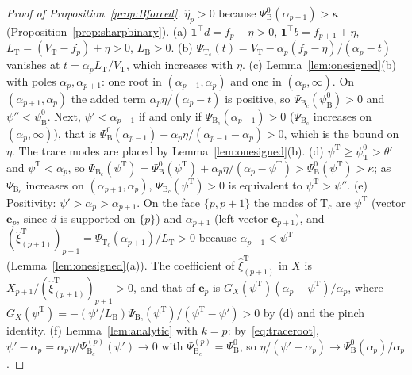 \documentclass[11pt,a4paper]{report}
\newcommand{\one}{\mathbf 1}
\newcommand{\bfe}{\mathbf e}
\newcommand{\Ts}{\mathrm T}
\newcommand{\Bs}{\mathrm B}
\begin{document}
\begin{proof}[Proof of Proposition~\ref{prop:Bforced}]
\(\hat\eta_p>0\) because \(\Psi^0_\Bs(\alpha_{p-1})>\kappa\) (Proposition~\ref{prop:sharpbinary}). (a) \(\one^\top d=f_p-\eta>0\), \(\one^\top b=f_{p+1}+\eta\),
\(L_\Ts=(V_\Ts-f_p)+\eta>0\), \(L_\Bs>0\). (b) \(\Psi_{\Ts_c}(t)=V_\Ts-\alpha_p(f_p-\eta)/(\alpha_p-t)\) vanishes at \(t=\alpha_pL_\Ts/V_\Ts\), which increases
with \(\eta\). (c) Lemma~\ref{lem:onesigned}(b) with poles \(\alpha_p,\alpha_{p+1}\): one root in \((\alpha_{p+1},\alpha_p)\) and one in
\((\alpha_p,\infty)\). On \((\alpha_{p+1},\alpha_p)\) the added term \(\alpha_p\eta/(\alpha_p-t)\) is positive, so \(\Psi_{\Bs_c}(\psi^0_\Bs)>0\) and
\(\psi''<\psi^0_\Bs\). Next, \(\psi'<\alpha_{p-1}\) if and only if \(\Psi_{\Bs_c}(\alpha_{p-1})>0\) (\(\Psi_{\Bs_c}\) increases on \((\alpha_p,\infty)\)), that is
\(\Psi^0_\Bs(\alpha_{p-1})-\alpha_p\eta/(\alpha_{p-1}-\alpha_p)>0\), which is the bound on \(\eta\). The trace modes are placed by
Lemma~\ref{lem:onesigned}(b). (d) \(\psi^\Ts\ge\psi^0_\Ts>\theta'\) and \(\psi^\Ts<\alpha_p\), so
\(\Psi_{\Bs_c}(\psi^\Ts)=\Psi^0_\Bs(\psi^\Ts)+\alpha_p\eta/(\alpha_p-\psi^\Ts)>\Psi^0_\Bs(\psi^\Ts)>\kappa\); as \(\Psi_{\Bs_c}\) increases on
\((\alpha_{p+1},\alpha_p)\), \(\Psi_{\Bs_c}(\psi^\Ts)>0\) is equivalent to \(\psi^\Ts>\psi''\). (e) Positivity: \(\psi'>\alpha_p>\alpha_{p+1}\). On the face
\(\{p,p+1\}\) the modes of \(\Ts_c\) are \(\psi^\Ts\) (vector \(\bfe_p\), since \(d\) is supported on \(\{p\}\)) and \(\alpha_{p+1}\) (left vector \(\bfe_{p+1}\)), and
\((\hat\xi^\Ts_{(p+1)})_{p+1}=\Psi_{\Ts_c}(\alpha_{p+1})/L_\Ts>0\) because \(\alpha_{p+1}<\psi^\Ts\) (Lemma~\ref{lem:onesigned}(a)). The coefficient of
\(\hat\xi^\Ts_{(p+1)}\) in \(X\) is \(X_{p+1}/(\hat\xi^\Ts_{(p+1)})_{p+1}>0\), and that of \(\bfe_p\) is \(G_X(\psi^\Ts)(\alpha_p-\psi^\Ts)/\alpha_p\), where
\(G_X(\psi^\Ts)=-(\psi'/L_\Bs)\Psi_{\Bs_c}(\psi^\Ts)/(\psi^\Ts-\psi')>0\) by (d) and the pinch identity. (f) Lemma~\ref{lem:analytic} with
\(k=p\): by~\eqref{eq:traceroot}, \(\psi'-\alpha_p=\alpha_p\eta/\Psi^{(p)}_{\Bs_c}(\psi')\to0\) with \(\Psi^{(p)}_{\Bs_c}=\Psi^0_\Bs\), so
\(\eta/(\psi'-\alpha_p)\to\Psi^0_\Bs(\alpha_p)/\alpha_p\).
\end{proof}
\end{document}
